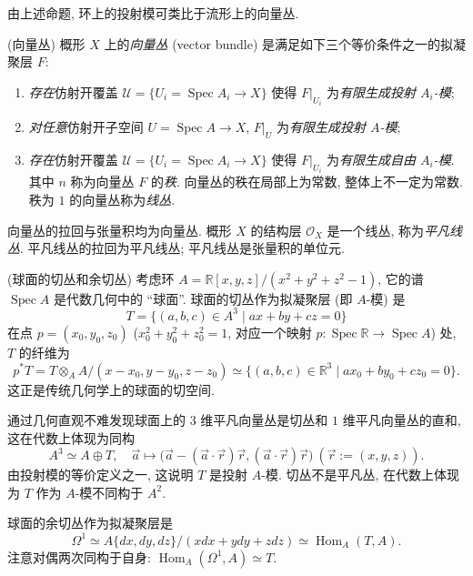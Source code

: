 \documentclass{book}
\begin{document}
	由上述命题, 环上的投射模可类比于流形上的向量丛.
	
	\begin{propdef}
		{(向量丛)}
		概形 $X$ 上的\emph{向量丛} (vector bundle) 是满足如下三个等价条件之一的拟凝聚层 $F$:
		\begin{enumerate}
			[(1)]
			\item \emph{存在}仿射开覆盖 $\mathcal U = \{U_i=\operatorname{Spec} A_i\to X\}$ 使得 $F|_{U_i}$ 为\emph{有限生成投射 $A_i$-模};
			\item \emph{对任意}仿射开子空间 $U=\operatorname{Spec} A\to X$,  $F|_{U}$ 为\emph{有限生成投射 $A$-模};
			\item \emph{存在}仿射开覆盖 $\mathcal U = \{U_i=\operatorname{Spec} A_i\to X\}$ 使得 $F|_{U_i}$ 为\emph{有限生成自由 $A_i$-模}.
			其中 $n$ 称为向量丛 $F$ 的\emph{秩}. 向量丛的秩在局部上为常数, 整体上不一定为常数. 秩为 $1$ 的向量丛称为\emph{线丛}.
		\end{enumerate}
	\end{propdef}
	
	向量丛的拉回与张量积均为向量丛.
	概形 $X$ 的结构层 $\mathcal O_X$ 是一个线丛, 称为\emph{平凡线丛}.
	平凡线丛的拉回为平凡线丛; 平凡线丛是张量积的单位元.
	
	
	\begin{example}
		{(球面的切丛和余切丛)}
		考虑环 $A=\mathbb{R}[x,y,z]/(x^2+y^2+z^2-1)$, 它的谱 $\operatorname{Spec} A$ 是代数几何中的 ``球面''. 球面的切丛作为拟凝聚层 (即 $A$-模) 是
		$$
		T= \{(a,b,c)\in A^3\mid ax+by+cz=0\}
		$$
		在点 $p=(x_0,y_0,z_0)$ ($x_0^2+y_0^2+z_0^2=1$, 对应一个映射 $p\colon \operatorname{Spec}\mathbb{R}\to\operatorname{Spec} A$) 处,
		$T$ 的纤维为
		$$
		p^*T = T\otimes_A A/(x-x_0,y-y_0,z-z_0)\simeq
		\{(a,b,c)\in\mathbb{R}^3\mid ax_0+by_0+cz_0=0\}.
		$$
		这正是传统几何学上的球面的切空间.
		
		通过几何直观不难发现球面上的 $3$ 维平凡向量丛是切丛和 $1$ 维平凡向量丛的直和, 这在代数上体现为同构
		$$
		A^3 \simeq A\oplus T,\quad
		\vec{a}\mapsto \big( \vec a - (\vec a\cdot\vec r)\vec r , (\vec a\cdot\vec r)\vec r \big)
		\ (\vec r:=(x,y,z)).$$
		由投射模的等价定义之一, 这说明 $T$ 是投射 $A$-模. 切丛不是平凡丛, 在代数上体现为 $T$ 作为 $A$-模不同构于 $A^2$.
		
		球面的余切丛作为拟凝聚层是
		$$
		\Omega^1 \simeq A\{dx,dy,dz\}/ (xdx+ydy+zdz) \simeq \operatorname{Hom}_A(T,A).
		$$
		注意对偶两次同构于自身: $\operatorname{Hom}_A(\Omega^1,A) \simeq T$.
	\end{example}
	
\end{document}
